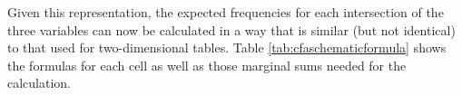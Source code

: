 \begin{table}[!htbp]
\caption{A two-dimensional representation of a three-dimensional contingency table}
\label{tab:cfaschematictable}
\end{table}


Given this representation, the expected frequencies for each intersection of the three variables can now be calculated in a way that is similar (but not identical) to that used for two-dimensional tables. Table \ref{tab:cfaschematicformula} shows the formulas for each cell as well as those marginal sums needed for the calculation.


